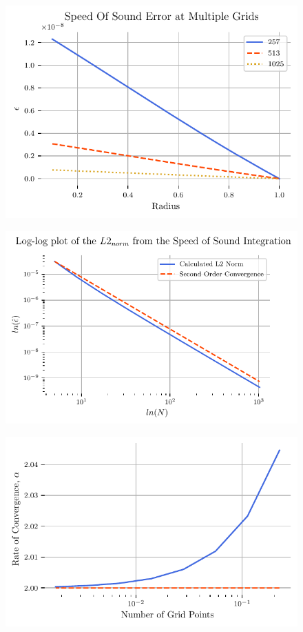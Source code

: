 \documentclass{article}
\begin{document}
\begin{figure}
    \centering
    \includegraphics[width=\textwidth]{tex-outputs/SpeedOfSoundComparison2.pdf}
\end{figure}

\begin{figure}
    \centering
    \includegraphics[width=\textwidth]{tex-outputs/SpeedOfSoundComparisonL2.pdf}
\end{figure}

\begin{figure}
    \centering
    \includegraphics[width=\textwidth]{tex-outputs/SpeedOfSoundComparisonROC.pdf}
\end{figure}
\end{document}
